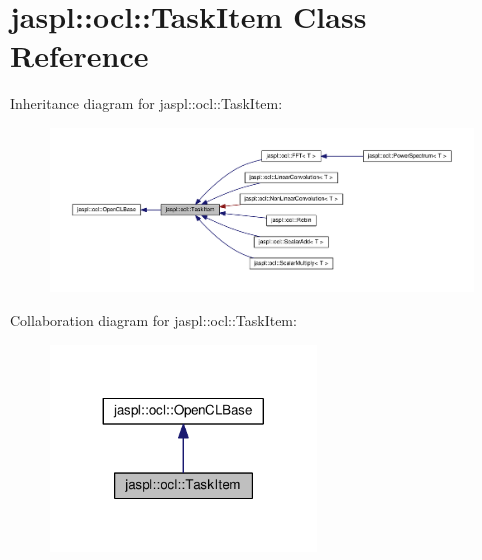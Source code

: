 \hypertarget{classjaspl_1_1ocl_1_1_task_item}{}\section{jaspl\+:\+:ocl\+:\+:Task\+Item Class Reference}
\label{classjaspl_1_1ocl_1_1_task_item}


Inheritance diagram for jaspl\+:\+:ocl\+:\+:Task\+Item\+:\nopagebreak
\begin{figure}[H]
\begin{center}
\leavevmode
\includegraphics[width=350pt]{classjaspl_1_1ocl_1_1_task_item__inherit__graph}
\end{center}
\end{figure}


Collaboration diagram for jaspl\+:\+:ocl\+:\+:Task\+Item\+:\nopagebreak
\begin{figure}[H]
\begin{center}
\leavevmode
\includegraphics[width=200pt]{classjaspl_1_1ocl_1_1_task_item__coll__graph}
\end{center}
\end{figure}

